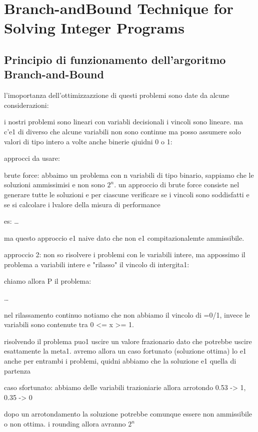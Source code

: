 \newpage
\section{Branch-andBound Technique for Solving Integer Programs}

\subsection{Principio di funzionamento dell'argoritmo Branch-and-Bound}

l'imoportanza dell'ottimizzazzione di questi problemi sono date da alcune considerazioni:

i nostri problemi sono lineari con variabli decisionali i vincoli sono lineare. ma c'e1 di diverso che alcune variabili non sono continue ma posso assumere solo valori di tipo intero a volte anche binerie qiuidni 0 o 1:

approcci da usare:

brute force:
abbaimo un problema con n variabili di tipo binario, sappiamo che le soluzioni ammissimisi e non sono $2^n$. un approccio di brute force consiste nel generare tutte le soluzioni e per ciascune verificare se i vincoli sono soddisfatti e se si calcolare i lvalore della misura di performance

es:
\dots

ma questo approccio e1 naive dato che non e1 compitazionalemte ammissibile.

approccio 2:
non so risolvere i problemi con le variabili intere, ma appossimo il problema a variabili intere e "rilasso" il vincolo di intergita1:

chiamo allora P  il problema:

\dots

nel rilassamento continuo notiamo che non abbiamo il vincolo di =0/1, invece le variabili sono contenute tra 0 <= x >= 1.

risolvendo il problema puo1 uscire un valore frazionario dato che potrebbe uscire esattamente la meta1. avremo allora un caso fortunato (soluzione ottima) lo e1 anche per entrambi i problemi, quidni abbiamo che la soluzione e1 quella di partenza


caso sfortunato: abbiamo delle variabili trazioniarie allora arrotondo 0.53 -> 1, 0.35 -> 0

dopo un arrotondamento la soluzione potrebbe comunque essere non ammissibile o non ottima. i rounding allora avranno $2^{n}$



